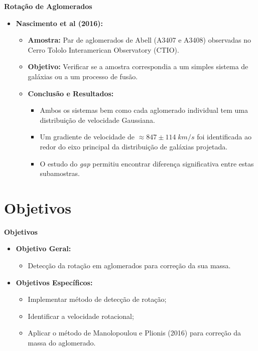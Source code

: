 \documentclass[xcolor=dvipsnames,10pt]{beamer}
\begin{document}
\begin{frame}{\textbf{Rotação de Aglomerados}}
\begin{itemize}
  \item {\textbf{Nascimento et al (2016):}}  
    \begin{itemize}
      \item \textbf{Amostra:} Par de aglomerados de Abell (A3407 e A3408) observadas no Cerro Tololo Interamerican Observatory (CTIO).
      \item \textbf{Objetivo:} Verificar se a amostra correspondia a um simples sistema de galáxias ou a um processo de fusão.
      \item \textbf{Conclusão e Resultados:}
      \begin{itemize}
        \item Ambos os sistemas bem como cada aglomerado individual tem uma distribuição de velocidade Gaussiana.
        \item Um gradiente de velocidade de $\approx 847 \pm 114\; {km/s}$ foi identificada ao redor do eixo principal da distribuição de galáxias projetada.
        \item O estudo do \textit{gap} permitiu encontrar diferença significativa entre estas subamostras.
      \end{itemize}
    \end{itemize}
\end{itemize}
\end{frame}

\section{Objetivos}
\begin{frame}{\textbf{Objetivos}}
  \begin{itemize}
    \item {\textbf{Objetivo Geral: }}
    \begin{itemize}
      \item Detecção da rotação em aglomerados para correção da sua massa.
    \end{itemize}
    \item {\textbf{Objetivos Específicos: }}
    \begin{itemize}
      \item Implementar método de detecção de rotação;
      \item Identificar a velocidade rotacional;
      \item Aplicar o método de Manolopoulou e Plionis (2016) para correção da massa do aglomerado.
    \end{itemize}
  \end{itemize}
\end{frame}
\end{document}
